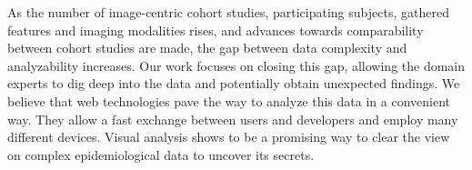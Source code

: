 \documentclass[journal]{style/vgtc} 			          %
\begin{document}
%
%
As the number of image-centric cohort studies, participating subjects, gathered features and imaging modalities rises, and advances towards comparability between cohort studies are made, the gap between data complexity and analyzability increases.
%
Our work focuses on closing this gap, allowing the domain experts to dig deep into the data and potentially obtain unexpected findings.
%
We believe that web technologies pave the way to analyze this data in a convenient way.
%
They allow a fast exchange between users and developers and employ many different devices.
%
Visual analysis shows to be a promising way to clear the view on complex epidemiological data to uncover its secrets.


\clearpage
\newpage


\end{document}
